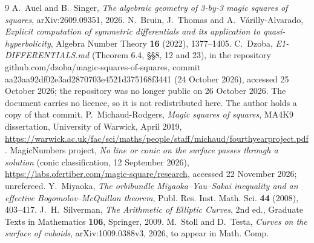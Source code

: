 \documentclass[11pt]{amsart}
\theoremstyle{definition}
\begin{document}
\begin{thebibliography}{9}
 A.~Auel and B.~Singer, \emph{The algebraic geometry of 3-by-3 magic squares of squares},
arXiv:2609.09351, 2026.
 N.~Bruin, J.~Thomas and A.~V\'arilly-Alvarado, \emph{Explicit computation of symmetric differentials and
its application to quasi-hyperbolicity}, Algebra Number Theory \textbf{16} (2022), 1377--1405.
 C.~Dzoba, \emph{E1-DIFFERENTIALS.md} (Theorem 6.4, \S\S8, 12 and 23), in the repository
github.com/dzoba/magic-squares-of-squares, commit aa23aa92df02e3ad2870703e4521d375168f3441 (24 October 2026),
accessed 25 October 2026; the repository was no longer public on 26 October 2026. The document carries no licence,
so it is not redistributed here. The author holds a copy of that commit.
 P.~Michaud-Rodgers, \emph{Magic squares of squares}, MA4K9 dissertation, University of Warwick, April
2019, \url{https://warwick.ac.uk/fac/sci/maths/people/staff/michaud/fourthyearproject.pdf}.
 MagicNumbers project, \emph{No line or conic on the surface passes through a solution} (conic
classification, 12 September 2026), \url{https://labs.ofertiber.com/magic-square/research}, accessed 22 November 2026;
unrefereed.
 Y.~Miyaoka, \emph{The orbibundle Miyaoka--Yau--Sakai inequality and an effective
Bogomolov--McQuillan theorem}, Publ. Res. Inst. Math. Sci. \textbf{44} (2008), 403--417.
 J.~H.~Silverman, \emph{The Arithmetic of Elliptic Curves}, 2nd ed., Graduate Texts in Mathematics
\textbf{106}, Springer, 2009.
 M.~Stoll and D.~Testa, \emph{Curves on the surface of cuboids}, arXiv:1009.0388v3, 2026, to appear in
Math. Comp.
\end{thebibliography}
\end{document}
